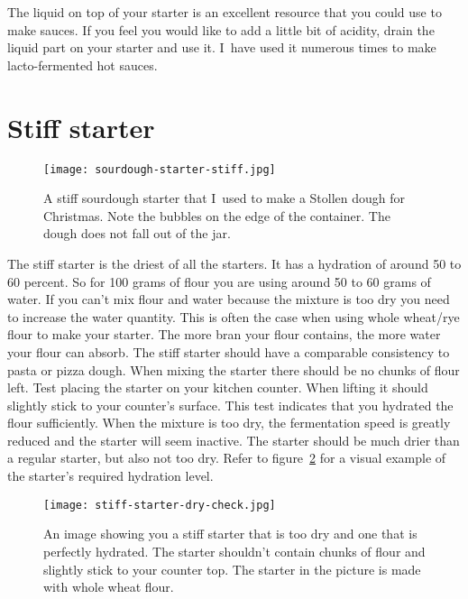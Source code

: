 The liquid on top of your starter is an excellent resource that you could use
to make sauces. If you feel you would like to add a little bit of acidity,
drain the liquid part on your starter and use it. I~have used it numerous
times to make lacto-fermented hot sauces.

\section{Stiff starter}%
\label{section:stiff-starter}

\begin{figure}[!htb]
  \texttt{[image: sourdough-starter-stiff.jpg]}
  \caption{A stiff sourdough starter that I~used to make a Stollen dough for Christmas. Note
  the bubbles on the edge of the container. The dough does not fall out of the
jar.}%
  \label{fig:stiff-sourdough-starter}
\end{figure}

The stiff starter is the driest of all the starters. It has a hydration of
around 50 to 60 percent. So for 100 grams of flour you are using around 50 to
60 grams of water. If you can't mix flour and water because the
mixture is too dry you need to increase the water quantity. This is often
the case when using whole wheat/rye flour to make your starter. The
more bran your flour contains, the more water your flour can absorb. The stiff
starter should have a comparable consistency to pasta or pizza dough. When
mixing the starter there should be no chunks of flour left. Test placing
the starter on your kitchen counter. When lifting it should slightly stick
to your counter's surface. This test indicates that you hydrated the flour sufficiently.
When the mixture is too dry, the fermentation speed is greatly reduced and
the starter will seem inactive. The starter should be much drier
than a regular starter, but also not too dry. Refer to figure~\ref{fig:stiff-starter-dry-check}
for a visual example of the starter's required hydration level. 

\begin{figure}[!htb]
  \texttt{[image: stiff-starter-dry-check.jpg]}
  \caption{An image showing you a stiff starter that is too dry and one that is perfectly hydrated.
  The starter shouldn't contain chunks of flour and slightly stick to your counter top. The
  starter in the picture is made with whole wheat flour.}%
  \label{fig:stiff-starter-dry-check}
\end{figure}


